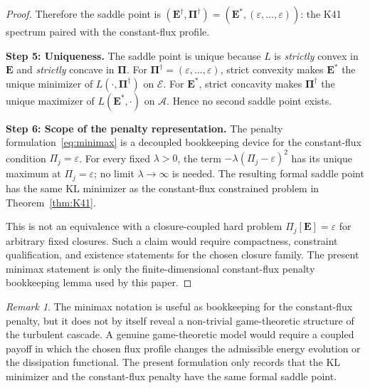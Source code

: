\documentclass[12pt,a4paper]{article}
\theoremstyle{definition}
\theoremstyle{plain}
\theoremstyle{remark}
\newtheorem{remark}[definition]{Remark}
\begin{document}
\begin{proof}
Therefore the saddle point is
$(\mathbf{E}^\dagger, \boldsymbol{\Pi}^\dagger) =
(\mathbf{E}^*, (\varepsilon, \dots, \varepsilon))$:
the K41 spectrum paired with the constant-flux profile.

\smallskip\noindent
\textbf{Step 5: Uniqueness.}\;
The saddle point is unique because $L$ is \emph{strictly} convex in
$\mathbf{E}$ and \emph{strictly} concave in $\boldsymbol{\Pi}$.
For $\boldsymbol{\Pi}^\dagger=(\varepsilon,\ldots,\varepsilon)$,
strict convexity makes $\mathbf{E}^*$ the unique minimizer of
$L(\cdot,\boldsymbol{\Pi}^\dagger)$ on $\mathcal E$.  For
$\mathbf{E}^*$, strict concavity makes $\boldsymbol{\Pi}^\dagger$ the
unique maximizer of $L(\mathbf{E}^*,\cdot)$ on $\mathcal A$.  Hence no
second saddle point exists.

\smallskip\noindent
\textbf{Step 6: Scope of the penalty representation.}\;
The penalty formulation~\eqref{eq:minimax} is a decoupled bookkeeping
device for the constant-flux condition $\Pi_j=\varepsilon$.  For every
fixed $\lambda>0$, the term $-\lambda(\Pi_j-\varepsilon)^2$ has its
unique maximum at $\Pi_j=\varepsilon$; no limit
$\lambda\to\infty$ is needed.  The resulting formal saddle point has the
same KL minimizer as the constant-flux constrained problem in
Theorem~\ref{thm:K41}.

This is not an equivalence with a closure-coupled hard problem
$\Pi_j[\mathbf{E}]=\varepsilon$ for arbitrary fixed closures.  Such a
claim would require compactness, constraint qualification, and existence
statements for the chosen closure family.  The present minimax statement
is only the finite-dimensional constant-flux penalty bookkeeping lemma
used by this paper.
\end{proof}

\begin{remark}
The minimax notation is useful as bookkeeping for the constant-flux
penalty, but it does not by itself reveal a non-trivial game-theoretic
structure of the turbulent cascade.  A genuine game-theoretic model would require
a coupled payoff in which the chosen flux profile changes the admissible
energy evolution or the dissipation functional.  The present formulation
only records that the KL minimizer and the constant-flux penalty have the
same formal saddle point.
\end{remark}
\end{document}

